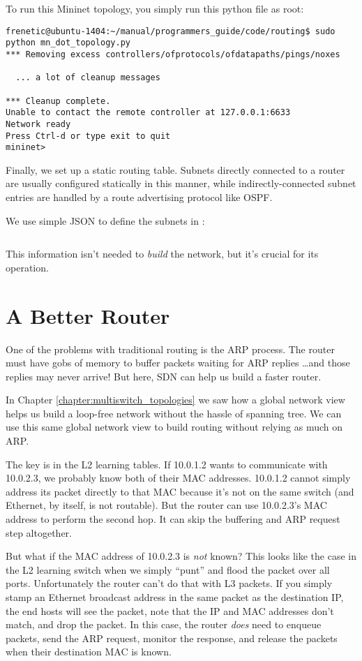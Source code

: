 To run this Mininet topology, you simply run this python file as root:

\begin{verbatim}
frenetic@ubuntu-1404:~/manual/programmers_guide/code/routing$ sudo python mn_dot_topology.py
*** Removing excess controllers/ofprotocols/ofdatapaths/pings/noxes

  ... a lot of cleanup messages 

*** Cleanup complete.
Unable to contact the remote controller at 127.0.0.1:6633
Network ready
Press Ctrl-d or type exit to quit
mininet>
\end{verbatim} 

Finally, we set up a static routing table.   Subnets directly connected to a router are usually 
configured statically in this manner, while indirectly-connected subnet entries are handled by
a route advertising protocol like OSPF.  

We use simple JSON to define the subnets in :

\inputminted{json}{code/routing/routing_table.json}

This information isn't needed to \emph{build} the network, but it's crucial for its operation.

\section{A Better Router}

One of the problems with traditional routing is the ARP process.  The router must have gobs of memory 
to buffer packets waiting for ARP replies \ldots and those replies may never arrive!  But here, SDN 
can help us build a faster router.

In Chapter \ref{chapter:multiswitch_topologies} we saw how a global network view helps us build a loop-free
network without the hassle of spanning tree.  We can use this same global network view to build
routing without relying as much on ARP.  

The key is in the L2 learning tables.  If 10.0.1.2 wants to communicate with 10.0.2.3, we probably know
both of their MAC addresses.  10.0.1.2 cannot simply address its packet directly to that MAC because
it's not on the same switch (and Ethernet, by itself, is not routable).  But the router can use 
10.0.2.3's MAC address to perform the second hop.  It can skip the buffering and ARP request step
altogether.

But what if the MAC address of 10.0.2.3 is \emph{not} known?  
This looks like the case in the L2 learning switch when we simply ``punt'' and flood the packet
over all ports.  
Unfortunately the router can't do that with L3 packets.  If you simply stamp an Ethernet broadcast
address in the same packet as the destination IP, the end hosts will see the packet, note that 
the IP and MAC addresses don't match, and drop the packet.
In this case, the router \emph{does} need
to enqueue packets, send the ARP request, monitor the response, and release the packets when 
their destination MAC is known.   

